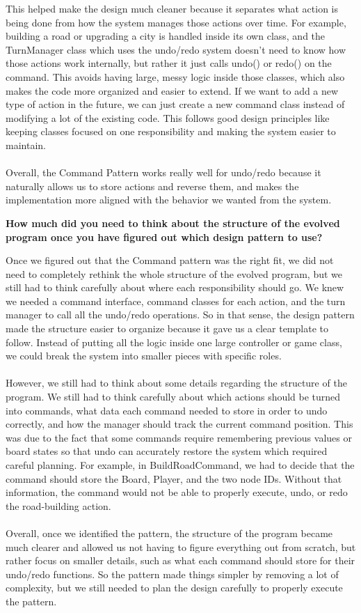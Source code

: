 This helped make the design much cleaner because it separates what action is being done from how the system manages those actions over time. For example, building a road or upgrading a city is handled inside its own class, and the TurnManager class which uses the undo/redo system doesn’t need to know how those actions work internally, but rather it just calls undo() or redo() on the command. This avoids having large, messy logic inside those classes, which also makes the code more organized and easier to extend. If we want to add a new type of action in the future, we can just create a new command class instead of modifying a lot of the existing code. This follows good design principles like keeping classes focused on one responsibility and making the system easier to maintain.\\\\
Overall, the Command Pattern works really well for undo/redo because it naturally allows us to store actions and reverse them, and makes the implementation more aligned with the behavior we wanted from the system.


\textbf{How much did you need to think about the structure of the evolved program once you have figured out which design pattern to use?}

Once we figured out that the Command pattern was the right fit, we did not need to completely rethink the whole structure of the evolved program, but we still had to think carefully about where each responsibility should go. We knew we needed a command interface, command classes for each action, and the turn manager to call all the undo/redo operations. So in that sense, the design pattern made the structure easier to organize because it gave us a clear template to follow. Instead of putting all the logic inside one large controller or game class, we could break the system into smaller pieces with specific roles.\\\\
However, we still had to think about some details regarding the structure of the program. We still had to think carefully about which actions should be turned into commands, what data each command needed to store in order to undo correctly, and how the manager should track the current command position. This was due to the fact that some commands require remembering previous values or board states so that undo can accurately restore the system which required careful planning. For example, in BuildRoadCommand, we had to decide that the command should store the Board, Player, and the two node IDs. Without that information, the command would not be able to properly execute, undo, or redo the road-building action.\\\\
Overall, once we identified the pattern, the structure of the program became much clearer and allowed us not having to figure everything out from scratch, but rather focus on smaller details, such as what each command should store for their undo/redo functions. So the pattern made things simpler by removing a lot of complexity, but we still needed to plan the design carefully to properly execute the pattern.\\

